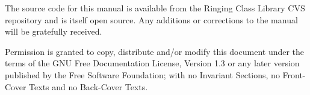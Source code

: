 \documentclass[a4paper,11pt,oneside]{book}
\begin{document}
The source code for this manual is available from the Ringing Class Library
CVS repository and is itself open source.  Any additions or corrections 
to the manual will be gratefully received.

\vfil
\footnotesize
Permission is granted to copy, distribute and/or modify this
document under the terms of the GNU Free Documentation License,
Version 1.3 or any later version published by the Free Software
Foundation; with no Invariant Sections, no Front-Cover Texts and
no Back-Cover Texts.
\end{document}
